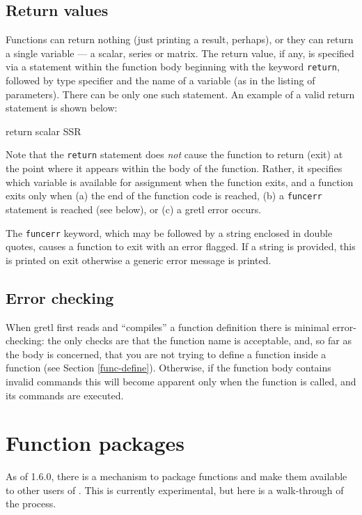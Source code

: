\subsection{Return values}

Functions can return nothing (just printing a result, perhaps), or
they can return a single variable --- a scalar, series or matrix.  The
return value, if any, is specified via a statement within the function
body beginning with the keyword \verb+return+, followed by type
specifier and the name of a variable (as in the listing of
parameters).  There can be only one such statement.  An example of a
valid return statement is shown below:
%    
\begin{code}
      return scalar SSR
\end{code}
%
Note that the \verb+return+ statement does \emph{not} cause the
function to return (exit) at the point where it appears within the
body of the function. Rather, it specifies which variable is
available for assignment when the function exits, and a function exits
only when (a) the end of the function code is reached, (b) a
\verb+funcerr+ statement is reached (see below), or (c) a gretl error
occurs.
    
The \verb+funcerr+ keyword, which may be followed by a string enclosed
in double quotes, causes a function to exit with an error flagged.  If
a string is provided, this is printed on exit otherwise a generic
error message is printed.
    

\subsection{Error checking}

When gretl first reads and ``compiles'' a function definition there is
minimal error-checking: the only checks are that the function name is
acceptable, and, so far as the body is concerned, that you are not
trying to define a function inside a function (see Section
\ref{func-define}). Otherwise, if the function body contains invalid
commands this will become apparent only when the function is called,
and its commands are executed.

\section{Function packages}
\label{func-packages}

As of  1.6.0, there is a mechanism to package functions and
make them available to other users of .  This is currently
experimental, but here is a walk-through of the process.

